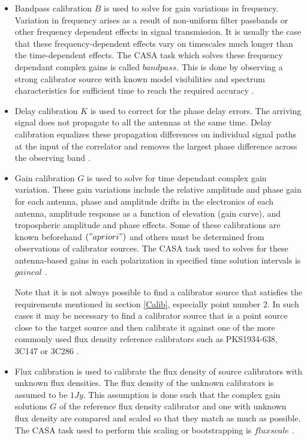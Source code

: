 \begin{itemize}

\item Bandpass calibration $B$ is used to solve for gain variations
in frequency. Variation in frequency arises as a result of non-uniform filter passbands or other frequency dependent effects in signal transmission. It is usually the case that these frequency-dependent effects vary on timescales much longer than the time-dependent effects. The CASA task which solves these frequency dependant complex gains is called $\textit{bandpass}$. This is done by observing a strong calibrator source with known model visibilities and spectrum characteristics for sufficient time to reach the required accuracy \citep{taylor1999synthesis}.

\item Delay calibration $K$ is used to correct for the phase delay errors. The arriving signal does not propagate to all the antennas at the same time. Delay calibration equalizes these propagation differences on individual signal paths at the input of the correlator and removes the largest phase difference across the observing band \citep{taylor1999synthesis}.   

\item Gain calibration $G$ is used to solve for time dependant complex gain variation. These gain variations include the relative amplitude and phase gain for each antenna, phase and amplitude drifts in the electronics of each antenna, amplitude response as a function of elevation (gain curve), and tropospheric amplitude and phase effects. Some of these calibrations are known beforehand $("a priori")$ and others must be determined from observations of calibrator sources. The CASA task used to solves for these antenna-based gains in each polarization in specified time solution intervals  is $\textit{gaincal}$ \citep{editioncasa}.  

Note that it is not always possible to find a calibrator source that satisfies the requirements mentioned in section \ref{Calib}, especially point number 2. In such cases it may be necessary to find a calibrator source that is a point source  close to the target source and then calibrate it against one of the more commonly used flux density reference calibrators such as PKS1934-638, 3C147 or 3C286 \citep{thompson2001interferometry}. 

\item Flux calibration is used to calibrate the flux density of source calibrators with unknown flux densities. The flux density of the unknown calibrators is assumed to be $1Jy$. This assumption is done such that the complex gain solutions $G$ of the reference flux density calibrator and one with unknown flux density are compared and scaled so that they match as much as possible. The CASA task used to perform this scaling or bootstrapping is $\textit{fluxscale}$ \citep{editioncasa}.
\end{itemize}

